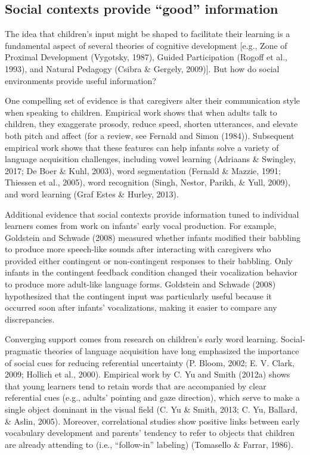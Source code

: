 \documentclass[english,floatsintext,man]{apa6}
\theoremstyle{definition}
\theoremstyle{definition}
\theoremstyle{definition}
\theoremstyle{remark}
\begin{document}
\subsection{\texorpdfstring{Social contexts provide \enquote{good}
information}{Social contexts provide good information}}\label{social-contexts-provide-good-information}

The idea that children's input might be shaped to facilitate their
learning is a fundamental aspect of several theories of cognitive
development {[}e.g., Zone of Proximal Development (Vygotsky, 1987),
Guided Participation (Rogoff et al., 1993), and Natural Pedagogy (Csibra
\& Gergely, 2009){]}. But how do social environments provide useful
information?

One compelling set of evidence is that caregivers alter their
communication style when speaking to children. Empirical work shows that
when adults talk to children, they exaggerate prosody, reduce speed,
shorten utterances, and elevate both pitch and affect (for a review, see
Fernald and Simon (1984)). Subsequent empirical work shows that these
features can help infants solve a variety of language acquisition
challenges, including vowel learning (Adriaans \& Swingley, 2017; De
Boer \& Kuhl, 2003), word segmentation (Fernald \& Mazzie, 1991;
Thiessen et al., 2005), word recognition (Singh, Nestor, Parikh, \&
Yull, 2009), and word learning (Graf Estes \& Hurley, 2013).

Additional evidence that social contexts provide information tuned to
individual learners comes from work on infants' early vocal production.
For example, Goldstein and Schwade (2008) measured whether infants
modified their babbling to produce more speech-like sounds after
interacting with caregivers who provided either contingent or
non-contingent responses to their babbling. Only infants in the
contingent feedback condition changed their vocalization behavior to
produce more adult-like language forms. Goldstein and Schwade (2008)
hypothesized that the contingent input was particularly useful because
it occurred soon after infants' vocalizations, making it easier to
compare any discrepancies.

Converging support comes from research on children's early word
learning. Social-pragmatic theories of language acquisition have long
emphasized the importance of social cues for reducing referential
uncertainty (P. Bloom, 2002; E. V. Clark, 2009; Hollich et al., 2000).
Empirical work by C. Yu and Smith (2012a) shows that young learners tend
to retain words that are accompanied by clear referential cues (e.g.,
adults' pointing and gaze direction), which serve to make a single
object dominant in the visual field (C. Yu \& Smith, 2013; C. Yu,
Ballard, \& Aslin, 2005). Moreover, correlational studies show positive
links between early vocabulary development and parents' tendency to
refer to objects that children are already attending to (i.e.,
\enquote{follow-in} labeling) (Tomasello \& Farrar, 1986).
\end{document}
